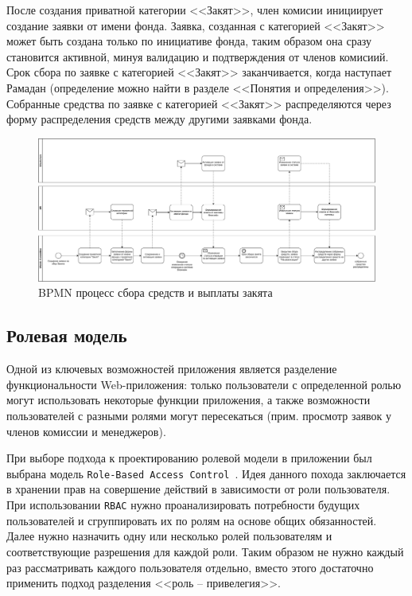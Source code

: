 \documentclass[a4paper,12pt,reqno]{article}
\begin{document}
После создания приватной категории <<Закят>>, член комисии инициирует создание заявки от имени фонда. Заявка, созданная с категорией <<Закят>> может быть создана только по инициативе фонда, таким образом она сразу становится активной, минуя валидацию и подтверждения от членов комисиий. Срок сбора по заявке с категорией <<Закят>> заканчивается, когда наступает Рамадан (определение можно найти в разделе <<Понятия и определения>>). Собранные средства по заявке с категорией <<Закят>> распределяются через форму распределения средств между другими заявками фонда.
	
\begin{figure}[H]
		\centering
		\includegraphics[width = \linewidth]{img/zakyat_flow.pdf}
		\caption{BPMN процесс сбора средств и выплаты закята}
		\label{pic: zakyat_flow}
\end{figure}

\subsection{Ролевая модель} \label{theory-rbac}

Одной из ключевых возможностей приложения является разделение функциональности Web-приложения: только пользователи с определенной ролью могут использовать некоторые функции приложения, а также возможности пользователей с разными ролями могут пересекаться (прим. просмотр заявок у членов комиссии и менеджеров). 

При выборе подхода к проектированию ролевой модели в приложении был выбрана модель \texttt{Role-Based Access Control}~\cite{rbac}. Идея данного похода заключается в хранении прав на совершение действий в зависимости от роли пользователя. При использовании \texttt{RBAC} нужно проанализировать потребности будущих пользователей и сгруппировать их по ролям на основе общих обязанностей. Далее нужно назначить одну или несколько ролей пользователям и соответствующие разрешения для каждой роли. Таким образом не нужно каждый раз рассматривать каждого пользователя отдельно, вместо этого достаточно применить подход разделения <<роль -- привелегия>>.
\end{document}
